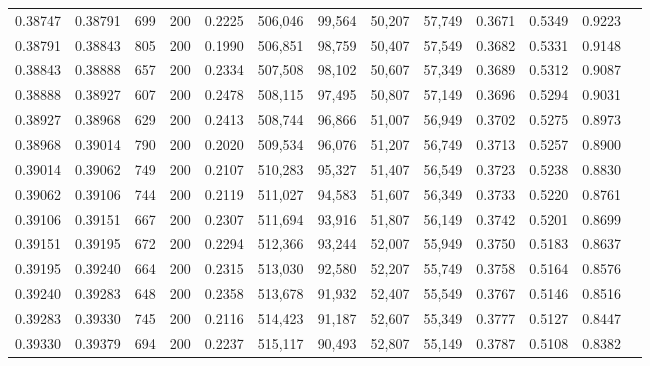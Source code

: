 \begin{tabular}{rrrrrrrrrrrrr}
0.38747 & 0.38791 &    699 & 200 &                                     0.2225 & 506,046 &  99,564 &  50,207 &  57,749 & 0.3671 & 0.5349 & 0.9223 \\
0.38791 & 0.38843 &    805 & 200 &                                     0.1990 & 506,851 &  98,759 &  50,407 &  57,549 & 0.3682 & 0.5331 & 0.9148 \\
0.38843 & 0.38888 &    657 & 200 &                                     0.2334 & 507,508 &  98,102 &  50,607 &  57,349 & 0.3689 & 0.5312 & 0.9087 \\
0.38888 & 0.38927 &    607 & 200 &                                     0.2478 & 508,115 &  97,495 &  50,807 &  57,149 & 0.3696 & 0.5294 & 0.9031 \\
0.38927 & 0.38968 &    629 & 200 &                                     0.2413 & 508,744 &  96,866 &  51,007 &  56,949 & 0.3702 & 0.5275 & 0.8973 \\
0.38968 & 0.39014 &    790 & 200 &                                     0.2020 & 509,534 &  96,076 &  51,207 &  56,749 & 0.3713 & 0.5257 & 0.8900 \\
0.39014 & 0.39062 &    749 & 200 &                                     0.2107 & 510,283 &  95,327 &  51,407 &  56,549 & 0.3723 & 0.5238 & 0.8830 \\
0.39062 & 0.39106 &    744 & 200 &                                     0.2119 & 511,027 &  94,583 &  51,607 &  56,349 & 0.3733 & 0.5220 & 0.8761 \\
0.39106 & 0.39151 &    667 & 200 &                                     0.2307 & 511,694 &  93,916 &  51,807 &  56,149 & 0.3742 & 0.5201 & 0.8699 \\
0.39151 & 0.39195 &    672 & 200 &                                     0.2294 & 512,366 &  93,244 &  52,007 &  55,949 & 0.3750 & 0.5183 & 0.8637 \\
0.39195 & 0.39240 &    664 & 200 &                                     0.2315 & 513,030 &  92,580 &  52,207 &  55,749 & 0.3758 & 0.5164 & 0.8576 \\
0.39240 & 0.39283 &    648 & 200 &                                     0.2358 & 513,678 &  91,932 &  52,407 &  55,549 & 0.3767 & 0.5146 & 0.8516 \\
0.39283 & 0.39330 &    745 & 200 &                                     0.2116 & 514,423 &  91,187 &  52,607 &  55,349 & 0.3777 & 0.5127 & 0.8447 \\
0.39330 & 0.39379 &    694 & 200 &                                     0.2237 & 515,117 &  90,493 &  52,807 &  55,149 & 0.3787 & 0.5108 & 0.8382 \\

\end{tabular}
